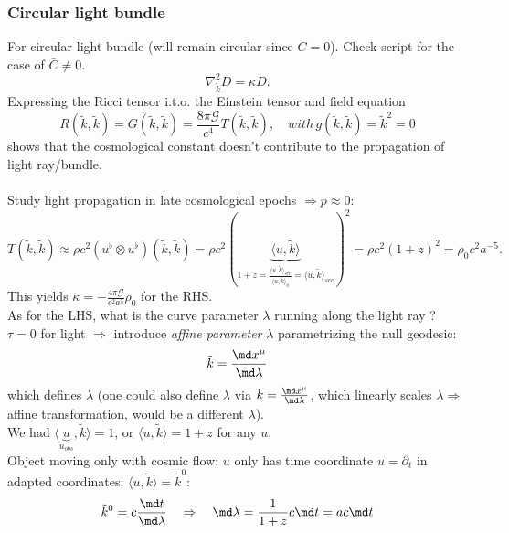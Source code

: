 \subsubsection{Circular light bundle}
 For circular light bundle (will remain circular since $C=0$). Check script for the case of $\bar{C}\neq 0$.
\begin{equation}
	\nabla^2_{\tilde{k}} D = \kappa D.
\end{equation}
Expressing the Ricci tensor i.t.o. the Einstein tensor and field equation
\begin{equation}
R(\tilde{k},\tilde{k}) = G(\tilde{k}, \tilde{k}) = \frac{8 \pi \mathcal{G}}{c^4} T(\tilde{k},\tilde{k}), \quad with\, g(\tilde{k},\tilde{k})=\tilde{k}^2=0
\end{equation}
shows that the cosmological constant doesn't contribute to the propagation of light ray/bundle.\\
\\
Study light propagation in late cosmological epochs $\Rightarrow p\approx 0$:
\begin{equation}
	T(\tilde{k},\tilde{k}) \approx \rho c^2 (u^{\flat} \otimes u^{\flat})(\tilde{k},\tilde{k}) = \rho c^2 (\underbrace{\langle u,\tilde{k} \rangle}_{1+z=\frac{\langle u,\tilde{k}\rangle_{src}}{\langle u, \tilde{k}\rangle_0} = \langle u,\tilde{k}\rangle_{src}}  )^2 = \rho  c^2 (1+z)^2 = \rho_0 c^2 a^{-5}.
\end{equation}
This yields $\kappa = - \frac{4 \pi \mathcal{G}}{c^2 a^5} \rho_0$ for the RHS. \\
As for the LHS, what is the curve parameter $\lambda$ running along the light ray ? $\tau=0$ for light $\Rightarrow$ introduce \emph{affine parameter} $\lambda$ parametrizing the null geodesic:
\begin{equation}
	\tilde{k} = \frac{\md x^{\mu}}{\md \lambda}
\end{equation}
which defines $\lambda$ (one could also define $\lambda$ via $k= \frac{\md x^{\mu}}{\md \lambda}$, which linearly scales $\lambda\Rightarrow$ affine transformation, would be a different $\lambda$). \\
We had $\langle \underbrace{u}_{u_{obs}},\tilde{k} \rangle = 1$, or $\langle u, \tilde{k} \rangle = 1+z$ for any $u$.\\
Object moving only with cosmic flow: $u$ only has time coordinate $u = \partial_t$ in adapted coordinates: $\langle u, \tilde{k} \rangle = \tilde{k}^0$:
\begin{equation}
	\tilde{k}^0 = c \frac{\md t}{\md \lambda} \quad \Rightarrow \quad \md \lambda = \frac{1}{1+z} c \md t = a c \md t 
	\end{equation}
